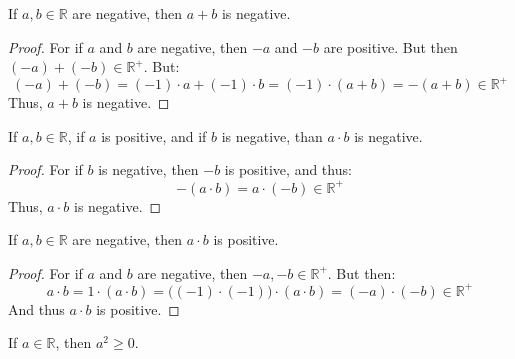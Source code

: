 \documentclass[crop=false,class=book,oneside]{standalone}
\begin{document}
            \begin{theorem}
                If $a,b\in\mathbb{R}$ are negative, then $a+b$ is
                negative.
            \end{theorem}
            \begin{proof}
                For if $a$ and $b$ are negative, then
                $\minus{a}$ and $\minus{b}$ are positive. But then
                $(\minus{a})+(\minus{b})\in\mathbb{R}^{+}$. But:
                \begin{equation}
                    (\minus{a})+(\minus{b})=
                    (\minus{1})\cdot{a}+(\minus{1})\cdot{b}
                    =(\minus{1})\cdot(a+b)
                    =\minus(a+b)\in\mathbb{R}^{+}
                \end{equation}
                Thus, $a+b$ is negative.
            \end{proof}
            \begin{theorem}
                If $a,b\in\mathbb{R}$, if $a$ is positive, and if
                $b$ is negative, than $a\cdot{b}$ is negative.
            \end{theorem}
            \begin{proof}
                For if $b$ is negative, then $\minus{b}$ is
                positive, and thus:
                \begin{equation}
                    \minus(a\cdot{b})
                    =a\cdot(\minus{b})\in\mathbb{R}^{+}
                \end{equation}
                Thus, $a\cdot{b}$ is negative.
            \end{proof}
            \begin{theorem}
                If $a,b\in\mathbb{R}$ are negative, then $a\cdot{b}$
                is positive.
            \end{theorem}
            \begin{proof}
                For if $a$ and $b$ are negative, then
                $\minus{a},\minus{b}\in\mathbb{R}^{+}$. But then:
                \begin{equation}
                    a\cdot{b}=1\cdot(a\cdot{b})
                    =\big((\minus{1})\cdot(\minus{1})\big)
                    \cdot(a\cdot{b})
                    =(\minus{a})\cdot(\minus{b})\in\mathbb{R}^{+}
                \end{equation}
                And thus $a\cdot{b}$ is positive.
            \end{proof}
            \begin{theorem}
                If $a\in\mathbb{R}$, then $a^{2}\geq{0}$.
            \end{theorem}
\end{document}
